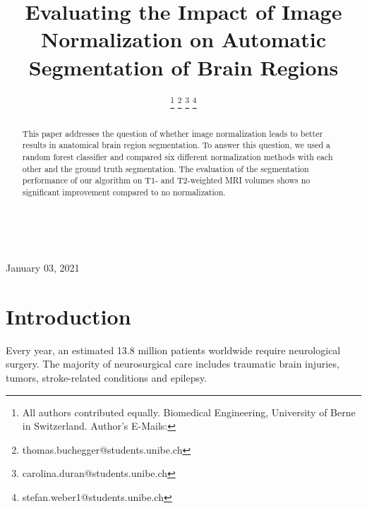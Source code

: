 \documentclass[article]{IEEEtran}
\begin{document}

\title{Evaluating the Impact of Image Normalization on Automatic Segmentation of Brain Regions}

\author{ 
\and {} 
\and {} 
\thanks{All authors contributed equally. Biomedical Engineering, University of Berne in Switzerland. Author's E-Mails:}%
\thanks{thomas.buchegger@students.unibe.ch}%
\thanks{carolina.duran@students.unibe.ch}%
\thanks{stefan.weber1@students.unibe.ch}}

\\
\maketitle
\newpage



\begin{abstract}
	This paper addresses the question of whether image normalization leads to better results in anatomical brain region segmentation. 
	To answer this question, we used a random forest classifier and compared six different normalization methods with each other and the ground truth segmentation. 
	The evaluation of the segmentation performance of our algorithm on T1- and T2-weighted MRI volumes shows no significant improvement compared to no normalization. 
\end{abstract}
\hfill January 03, 2021


\section{Introduction}

	Every year, an estimated 13.8 million patients worldwide require neurological surgery. The majority of neurosurgical care includes traumatic brain injuries, tumors, stroke-related conditions and epilepsy. \cite{Dewan2019}
	
\end{document}
